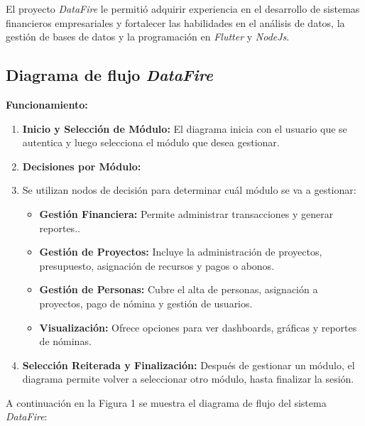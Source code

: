 \documentclass[protocolo.tex]{subfiles}
\begin{document}
El proyecto \textit{DataFire} le permitió adquirir experiencia en el desarrollo de sistemas financieros empresariales y fortalecer las habilidades en el análisis de datos, la gestión de bases de datos y la programación en \textit{Flutter} y \textit{NodeJs}.

\subsection{Diagrama de flujo \textit{DataFire} }
\textbf{Funcionamiento:}
\begin{enumerate}
    \item \textbf{Inicio y Selección de Módulo:}  
    El diagrama inicia con el usuario que se autentica y luego selecciona el módulo que desea gestionar.
    \item \textbf{Decisiones por Módulo:} 
    \item Se utilizan nodos de decisión para determinar cuál módulo se va a gestionar:
        \begin{itemize}
            \item \textbf{Gestión Financiera:}  Permite administrar transacciones y generar reportes..
            \item \textbf{Gestión de Proyectos:}  Incluye la administración de proyectos, presupuesto, asignación de recursos y pagos o abonos.
            \item \textbf{Gestión de Personas:}  Cubre el alta de personas, asignación a proyectos, pago de nómina y gestión de usuarios.
            \item \textbf{Visualización:} Ofrece opciones para ver dashboards, gráficas y reportes de nóminas.
        \end{itemize}
    \item \textbf{Selección Reiterada y Finalización:} 
    Después de gestionar un módulo, el diagrama permite volver a seleccionar otro módulo, hasta finalizar la sesión.
\end{enumerate}

A continuación en la Figura 1 se muestra el diagrama de flujo del sistema \textit{DataFire}:\vspace{2mm}
\end{document}
